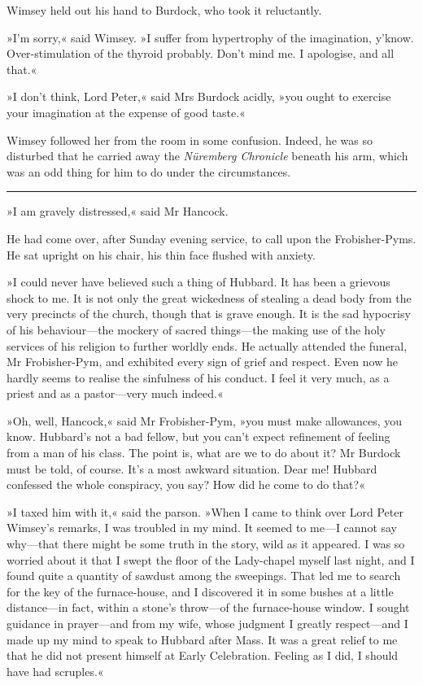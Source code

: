 Wimsey held out his hand to Burdock, who took it reluctantly.

»I'm sorry,« said Wimsey. »I suffer from hypertrophy of the imagination, y'know. Over-stimulation of the thyroid probably. Don't mind me. I apologise, and all that.«

»I don't think, Lord Peter,« said Mrs Burdock acidly, »you ought to exercise your imagination at the expense of good taste.«

Wimsey followed her from the room in some confusion. Indeed, he was so disturbed that he carried away the \textit{Nüremberg Chronicle} beneath his arm, which was an odd thing for him to do under the circumstances.

\noindent\hfil\rule{0.5\textwidth}{.4pt}\hfil 

»I am gravely distressed,« said Mr Hancock.

He had come over, after Sunday evening service, to call upon the Frobisher-Pyms. He sat upright on his chair, his thin face flushed with anxiety.

»I could never have believed such a thing of Hubbard. It has been a grievous shock to me. It is not only the great wickedness of stealing a dead body from the very precincts of the church, though that is grave enough. It is the sad hypocrisy of his behaviour—the mockery of sacred things—the making use of the holy services of his religion to further worldly ends. He actually attended the funeral, Mr Frobisher-Pym, and exhibited every sign of grief and respect. Even now he hardly seems to realise the sinfulness of his conduct. I feel it very much, as a priest and as a pastor—very much indeed.«

»Oh, well, Hancock,« said Mr Frobisher-Pym, »you must make allowances, you know. Hubbard's not a bad fellow, but you can't expect refinement of feeling from a man of his class. The point is, what are we to do about it? Mr Burdock must be told, of course. It's a most awkward situation. Dear me! Hubbard confessed the whole conspiracy, you say? How did he come to do that?«

»I taxed him with it,« said the parson. »When I came to think over Lord Peter Wimsey's remarks, I was troubled in my mind. It seemed to me—I cannot say why—that there might be some truth in the story, wild as it appeared. I was so worried about it that I swept the floor of the Lady-chapel myself last night, and I found quite a quantity of sawdust among the sweepings. That led me to search for the key of the furnace-house, and I discovered it in some bushes at a little distance—in fact, within a stone's throw—of the furnace-house window. I sought guidance in prayer—and from my wife, whose judgment I greatly respect—and I made up my mind to speak to Hubbard after Mass. It was a great relief to me that he did not present himself at Early Celebration. Feeling as I did, I should have had scruples.«

